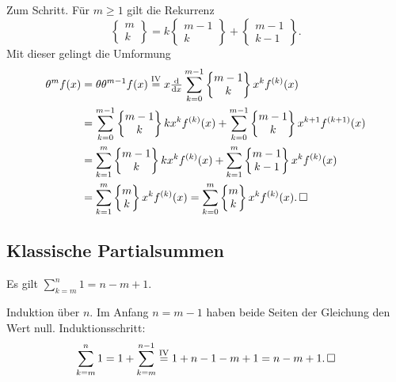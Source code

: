 \begin{Beweis}
Zum Schritt. Für $m\ge 1$ gilt die Rekurrenz
\[\begin{Bmatrix}m\\ k\end{Bmatrix} = k\begin{Bmatrix}m-1\\ k\end{Bmatrix} + \begin{Bmatrix}m-1\\ k-1\end{Bmatrix}.\]
Mit dieser gelingt die Umformung
\begin{align*}
\theta^m f(x) &= \theta \theta^{m-1} f(x) \stackrel{\mathrm{IV}}=
x\tfrac{\mathrm d}{\mathrm dx}\sum_{k=0}^{m-1}\begin{Bmatrix}m-1\\ k\end{Bmatrix}x^k f^{(k)}(x)\\
&= \sum_{k=0}^{m-1}\begin{Bmatrix}{m-1}\\ k\end{Bmatrix}kx^k f^{(k)}(x)
+ \sum_{k=0}^{m-1}\begin{Bmatrix}m-1\\ k\end{Bmatrix}x^{k+1} f^{(k+1)}(x)\\
&= \sum_{k=1}^m\begin{Bmatrix}{m-1}\\ k\end{Bmatrix}kx^k f^{(k)}(x)
+ \sum_{k=1}^m\begin{Bmatrix}m-1\\ k-1\end{Bmatrix}x^k f^{(k)}(x)\\
&= \sum_{k=1}^m\begin{Bmatrix}m\\ k\end{Bmatrix}x^k f^{(k)}(x)
= \sum_{k=0}^m\begin{Bmatrix}m\\ k\end{Bmatrix}x^k f^{(k)}(x).\,\square
\end{align*}
\end{Beweis}

\newpage
\subsection{Klassische Partialsummen}

\begin{Satz}%
\label{sum-const}\newlinefirst
Es gilt $\displaystyle\sum_{k=m}^n 1 = n-m+1$.
\end{Satz}
\begin{Beweis}
Induktion über $n$. Im Anfang $n=m-1$ haben beide Seiten
der Gleichung den Wert null. Induktionsschritt:
\[\sum_{k=m}^n 1 = 1 + \sum_{k=m}^{n-1}
\stackrel{\mathrm{IV}}= 1 + n-1-m+1 = n-m+1.\,\square\]
\end{Beweis}

